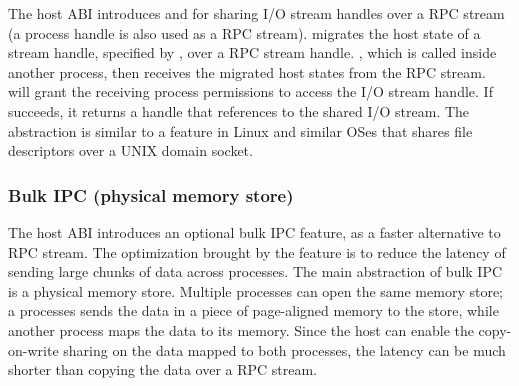 The host ABI introduces  and  for sharing I/O stream handles over a RPC stream (a process handle is also used as a RPC stream).
migrates the host state of a stream handle, specified by ,
over a RPC stream handle.
,
which is called inside another process,
then receives the migrated host states from the RPC stream.
will grant the receiving process permissions to access the I/O stream handle. %
If  succeeds, it returns a handle
that references to the shared I/O stream.
The abstraction is similar to a feature in Linux and similar OSes that
shares file descriptors over a UNIX domain socket.

\subsubsection*{Bulk IPC (physical memory store)}





The host ABI introduces an optional bulk IPC feature, as a faster alternative to RPC stream.
The optimization brought
by the feature
is to reduce the latency of sending large chunks of data across processes.
The main abstraction of bulk IPC is a physical memory store.
Multiple processes can open the same memory store;
a processes sends the data in a piece of page-aligned memory to the store,
while another process maps the data to its memory.
Since the host can enable the copy-on-write sharing on the data mapped to both processes,
the latency can be much shorter than copying the data over a RPC stream.




